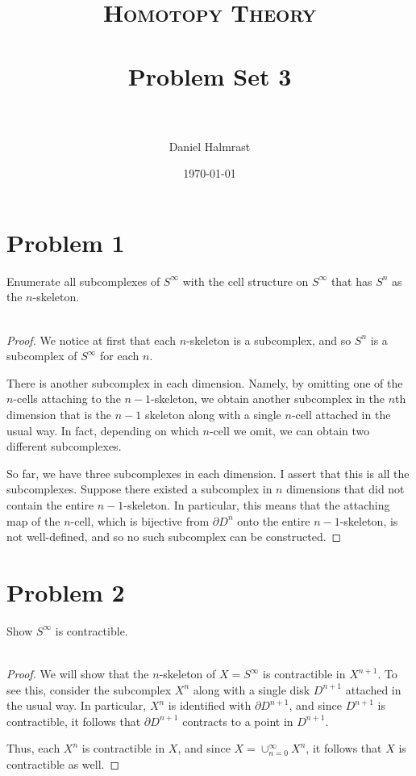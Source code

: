 \documentclass[fontsize=11pt]{scrartcl} %
\title{	
\normalfont \normalsize 
\textsc{Homotopy Theory} \\ [25pt] %
\horrule{0.5pt} \\[0.4cm] %
\huge Problem Set 3 \\ %
\horrule{2pt} \\[0.5cm] %
}
\author{Daniel Halmrast} %
\date{\normalsize\today} %
\numberwithin{equation}{section} %
\numberwithin{figure}{section} %
\numberwithin{table}{section} %
\begin{document}
\maketitle %

\section*{Problem 1} %
Enumerate all subcomplexes of $S^{\infty}$ with the cell structure on
$S^{\infty}$ that has $S^n$ as the $n$-skeleton.
\\
\\
\begin{proof}
    We notice at first that each $n$-skeleton is a subcomplex, and so $S^n$ is a
    subcomplex of $S^{\infty}$ for each $n$.

    There is another subcomplex in each dimension. Namely, by omitting one of
    the $n$-cells attaching to the $n-1$-skeleton, we obtain another subcomplex
    in the $n$th dimension that is the $n-1$ skeleton along with a single
    $n$-cell attached in the usual way. In fact, depending on which $n$-cell we
    omit, we can obtain two different subcomplexes.

    So far, we have three subcomplexes in each dimension. I assert that this is
    all the subcomplexes. Suppose there existed a subcomplex in $n$ dimensions
    that did not contain the entire $n-1$-skeleton. In particular, this means
    that the attaching map of the $n$-cell, which is bijective from $\partial
    D^n$ onto the entire
    $n-1$-skeleton, is not well-defined, and so no such subcomplex can be
    constructed.
\end{proof}


\section*{Problem 2} %
Show $S^{\infty}$ is contractible.
\\
\\
\begin{proof}
    We will show that the $n$-skeleton of $X=S^{\infty}$ is contractible in
    $X^{n+1}$. To see this, consider the subcomplex $X^n$ along with a single
    disk $D^{n+1}$ attached in the usual way. In particular, $X^n$ is identified
    with $\partial D^{n+1}$, and since $D^{n+1}$ is contractible, it follows
    that $\partial D^{n+1}$ contracts to a point in
    $D^{n+1}$.

    Thus, each $X^n$ is contractible in $X$, and since
    $X=\cup_{n=0}^{\infty}X^n$, it follows that $X$ is contractible as well.
\end{proof}
\end{document}
